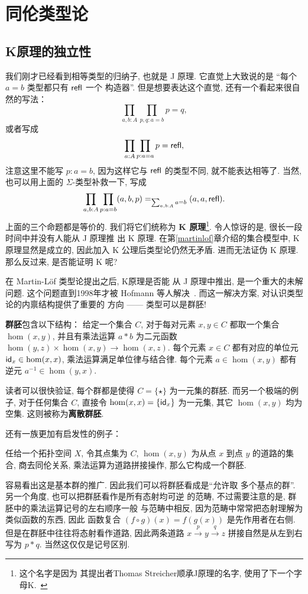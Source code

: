 \chapter{同伦类型论}
\section{K原理的独立性}\label{hott:independent}
我们刚才已经看到相等类型的归纳子, 也就是 J 原理. 它直觉上大致说的是
“每个 \(a = b\) 类型都只有 \(\textnormal{\textsf{refl}}\) 一个
构造器”. 但是想要表达这个直觉, 还有一个看起来很自然的写法：
\[\prod_{a,b : A} \prod_{p,q : a = b} p = q,\]
或者写成
\[\prod_{a : A} \prod_{p : a = a} p = \textnormal{\textsf{refl}},\]
注意这里不能写 \(p : a = b\), 因为这样它与
\(\textnormal{\textsf{refl}}\) 的类型不同, 就不能表达相等了.
当然, 也可以用上面的 \(\Sigma\)-类型补救一下, 写成
\[\prod_{a,b : A} \prod_{p: a = b} (a,b,p) =_{\sum_{a,b : A}a = b} (a,a,\textnormal{\textsf{refl}}).\]
上面的三个命题都是等价的. 我们将它们统称为
\textbf{K 原理}\footnote{这个名字是因为
其提出者Thomas Streicher顺承J原理的名字, 使用了下一个字母K.~\cite{streicher:1993:K}}.
令人惊讶的是, 很长一段时间中并没有人能从 J 原理推
出 K 原理. 在第\ref{martinlof}章介绍的集合模型中,
K 原理显然是成立的, 因此加入 K 公理后类型论仍然无矛盾.
进而无法证伪 K 原理. 那么反过来, 是否能证明 K 呢?

在 Martin-L\"of 类型论提出之后, K原理是否能
从 J 原理中推出, 是一个重大的未解问题.
这个问题直到1998年才被 Hofmann 等人解决~\cite{hofmann:1998:groupoid}.
而这一解决方案, 对认识类型论的内禀结构提供了重要的
方向 ------ 类型可以是群胚!

\begin{definition}
\textbf{群胚}包含以下结构：
给定一个集合 \(C\), 对于每对元素 \(x,y\in C\)
都取一个集合 \(\hom(x,y)\), 并且有乘法运算
\(a * b\) 为二元函数 \(\hom(y,z) \times \hom(x,y) \to \hom(x,z)\).
每个元素 \(x \in C\) 都有对应的单位元
\(\textnormal{\textsf{id}}_x \in \hom(x,x)\), 乘法运算满足单位律与结合律.
每个元素 \(a \in \hom(x,y)\) 都有逆元
\(a^{-1} \in \hom(y,x)\).
\end{definition}
读者可以很快验证, 每个群都是使得 \(C = \{\star\}\)
为一元集的群胚. 而另一个极端的例子, 对于任何集合 \(C\),
直接令 \(\hom(x,x) = \{\textnormal{\textsf{id}}_x\}\) 为一元集, 其它 \(\hom(x,y)\)
均为空集. 这则被称为\textbf{离散群胚}.

还有一族更加有启发性的例子：
\begin{example}
任给一个拓扑空间 \(X\), 令其点集为
\(C\), \(\hom(x,y)\) 为从点 \(x\) 到点
\(y\) 的道路的集合, 商去同伦关系,
乘法运算为道路拼接操作, 那么它构成一个群胚.
\end{example}
容易看出这是基本群的推广. 因此我们可以将群胚看成是“允许取
多个基点的群”. 另一个角度, 也可以把群胚看作是所有态射均可逆
的范畴, 不过需要注意的是, 群胚中的乘法运算记号的左右顺序一般
与范畴中相反, 因为范畴中常常把态射理解为类似函数的东西, 因此
函数复合 \((f \circ g)(x) = f(g(x))\) 是先作用者在右侧.
但是在群胚中往往将态射看作道路, 因此两条道路
\(x \xrightarrow p y \xrightarrow q z\)
拼接自然是从左到右写为 \(p * q\). 当然这仅仅是记号区别.

